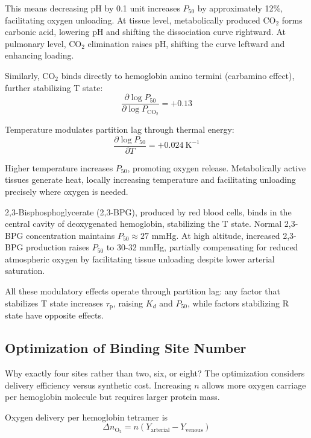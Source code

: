 \documentclass[10pt,twocolumn,a4paper]{article}
\theoremstyle{remark}
\newcommand{\taulag}{\tau_{\mathrm{p}}}
\begin{document}
This means decreasing pH by 0.1 unit increases $P_{50}$ by approximately 12\%, facilitating oxygen unloading. At tissue level, metabolically produced CO$_{2}$ forms carbonic acid, lowering pH and shifting the dissociation curve rightward. At pulmonary level, CO$_{2}$ elimination raises pH, shifting the curve leftward and enhancing loading.

Similarly, CO$_{2}$ binds directly to hemoglobin amino termini (carbamino effect), further stabilizing T state:
\begin{equation}
\frac{\partial \log P_{50}}{\partial \log P_{\mathrm{CO}_{2}}} = +0.13
\end{equation}

Temperature modulates partition lag through thermal energy:
\begin{equation}
\frac{\partial \log P_{50}}{\partial T} = +0.024~\mathrm{K}^{-1}
\end{equation}

Higher temperature increases $P_{50}$, promoting oxygen release. Metabolically active tissues generate heat, locally increasing temperature and facilitating unloading precisely where oxygen is needed.

2,3-Bisphosphoglycerate (2,3-BPG), produced by red blood cells, binds in the central cavity of deoxygenated hemoglobin, stabilizing the T state. Normal 2,3-BPG concentration maintains $P_{50} \approx 27$ mmHg. At high altitude, increased 2,3-BPG production raises $P_{50}$ to 30-32 mmHg, partially compensating for reduced atmospheric oxygen by facilitating tissue unloading despite lower arterial saturation.

All these modulatory effects operate through partition lag: any factor that stabilizes T state increases $\taulag$, raising $K_{d}$ and $P_{50}$, while factors stabilizing R state have opposite effects.

\subsection{Optimization of Binding Site Number}

Why exactly four sites rather than two, six, or eight? The optimization considers delivery efficiency versus synthetic cost. Increasing $n$ allows more oxygen carriage per hemoglobin molecule but requires larger protein mass.

Oxygen delivery per hemoglobin tetramer is
\begin{equation}
\Delta n_{\mathrm{O}_{2}} = n(Y_{\mathrm{arterial}} - Y_{\mathrm{venous}})
\end{equation}
\end{document}
